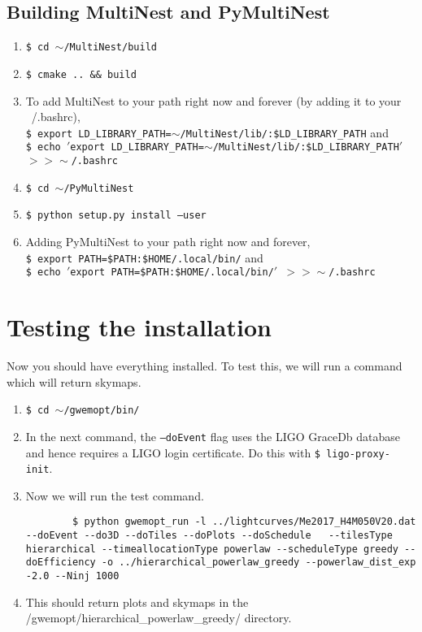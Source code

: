 \documentclass[11pt]{article}
\begin{document}
\subsection{Building MultiNest and PyMultiNest}
\begin{enumerate}
	\item {\tt \$ cd $\sim$/MultiNest/build}
	\item {\tt \$ cmake .. \&\& build}
	\item To add MultiNest to your path right now and forever (by adding it to your ~/.bashrc), \\{\tt \$ export LD\_LIBRARY\_PATH=$\sim$/MultiNest/lib/:\$LD\_LIBRARY\_PATH} and \\{\tt \$ echo $'$export LD\_LIBRARY\_PATH=$\sim$/MultiNest/lib/:\$LD\_LIBRARY\_PATH$'$ $>>\sim$/.bashrc}
	\item {\tt \$ cd $\sim$/PyMultiNest}
	\item {\tt \$ python setup.py install --user}
	\item Adding PyMultiNest to your path right now and forever,\\{\tt \$ export PATH=\$PATH:\$HOME/.local/bin/} and \\{\tt \$ echo $'$export PATH=\$PATH:\$HOME/.local/bin/$'$ $>>\sim$/.bashrc}
\end{enumerate}

\section{Testing the installation}
Now you should have everything installed. To test this, we will run a command which will return skymaps.
\begin{enumerate}
	\item {\tt \$ cd $\sim$/gwemopt/bin/}
	\item In the next command, the {\tt --doEvent} flag uses the LIGO GraceDb database and hence requires a LIGO login certificate. Do this with {\tt \$ ligo-proxy-init}.
	\item Now we will run the test command.
	\begin{lstlisting}
		$ python gwemopt_run -l ../lightcurves/Me2017_H4M050V20.dat --doEvent --do3D --doTiles --doPlots --doSchedule 	--tilesType hierarchical --timeallocationType powerlaw --scheduleType greedy --doEfficiency -o ../hierarchical_powerlaw_greedy --powerlaw_dist_exp -2.0 --Ninj 1000	
	\end{lstlisting}
	\item This should return plots and skymaps in the /gwemopt/hierarchical\_powerlaw\_greedy/ directory.

\end{enumerate}
\end{document}
